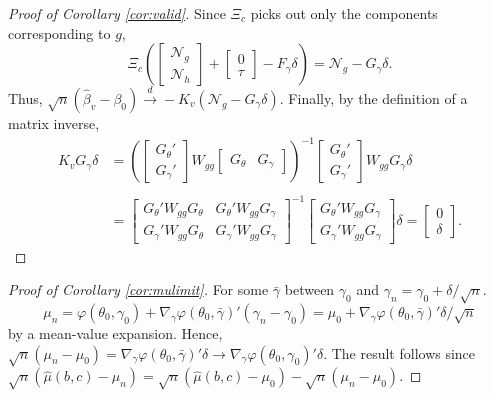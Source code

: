 \begin{proof}[Proof of Corollary \ref{cor:valid}]
Since $\Xi_c$ picks out only the components corresponding to $g$,
	$$\Xi_c \left(\left[\begin{array}{c} \mathscr{N}_g\\  \mathscr{N}_h\end{array}\right]+ \left[ \begin{array}{c} 0\\ \tau\end{array}\right] - F_\gamma\delta\right) =  \mathscr{N}_g - G_\gamma \delta.$$
Thus, $\sqrt{n}\left( \widehat{\beta}_v - \beta_0 \right) \overset{d}{\rightarrow} -K_v\left(\mathscr{N}_g - G_\gamma \delta\right)$.
Finally, by the definition of a matrix inverse,
	\begin{align*}
		K_v G_\gamma \delta
    &= \left(\left[\begin{array}{c}G_\theta' \\ G_\gamma'\end{array}\right] W_{gg} \left[\begin{array}{cc} G_\theta & G_\gamma \end{array}\right] \right)^{-1} \left[\begin{array}{c}G_\theta' \\ G_\gamma'\end{array}\right]W_{gg} G_\gamma\delta\\ \\
			&= \left[\begin{array}{cc} 
				G_\theta'W_{gg}G_\theta & G_\theta'W_{gg}G_\gamma\\
				G_\gamma'W_{gg}G_\theta & G_\gamma'W_{gg}G_\gamma
			\end{array} \right]^{-1}
			\left[\begin{array}{c}
				G_\theta'W_{gg}G_\gamma\\
				G_\gamma'W_{gg}G_\gamma
			\end{array}\right]\delta =\left[\begin{array}{c} 0\\ \delta\end{array}\right].
	\end{align*}
\end{proof}


\begin{proof}[Proof of Corollary \ref{cor:mulimit}]
For some $\bar{\gamma}$ between $\gamma_0$ and $\gamma_n = \gamma_0 +\delta/\sqrt{n}$. 
		\[\mu_n  = \varphi(\theta_0, \gamma_0)+ \nabla_\gamma \varphi(\theta_0, \bar{\gamma})'(\gamma_n - \gamma_0) = \mu_0 + \nabla_\gamma \varphi(\theta_0, \bar{\gamma})' \delta/\sqrt{n}\]
by a mean-value expansion.
Hence, $\sqrt{n}(\mu_n - \mu_0) = \nabla_\gamma \varphi(\theta_0, \bar{\gamma})' \delta \rightarrow \nabla_\gamma \varphi(\theta_0, \gamma_0)' \delta$.
The result follows since $\sqrt{n}\left(\widehat{\mu}(b,c) - \mu_n \right)  = \sqrt{n}\left( \widehat{\mu}(b,c) - \mu_0 \right) - \sqrt{n}\left(\mu_n - \mu_0\right)$.
\end{proof}


